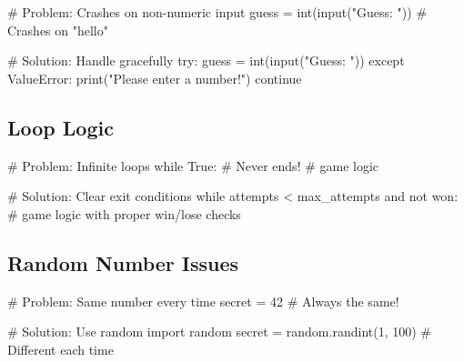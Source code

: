 \documentclass[
  letterpaper,
  DIV=11,
  numbers=noendperiod,
  oneside]{scrreprt}
\newenvironment{Shaded}{}{}
\newcommand{\BuiltInTok}[1]{\textcolor[rgb]{0.84,0.23,0.29}{#1}}
\newcommand{\CommentTok}[1]{\textcolor[rgb]{0.42,0.45,0.49}{#1}}
\newcommand{\ControlFlowTok}[1]{\textcolor[rgb]{0.84,0.23,0.29}{#1}}
\newcommand{\DecValTok}[1]{\textcolor[rgb]{0.00,0.36,0.77}{#1}}
\newcommand{\ImportTok}[1]{\textcolor[rgb]{0.01,0.18,0.38}{#1}}
\newcommand{\KeywordTok}[1]{\textcolor[rgb]{0.84,0.23,0.29}{#1}}
\newcommand{\NormalTok}[1]{\textcolor[rgb]{0.14,0.16,0.18}{#1}}
\newcommand{\OperatorTok}[1]{\textcolor[rgb]{0.14,0.16,0.18}{#1}}
\newcommand{\PreprocessorTok}[1]{\textcolor[rgb]{0.84,0.23,0.29}{#1}}
\newcommand{\StringTok}[1]{\textcolor[rgb]{0.01,0.18,0.38}{#1}}
\newcommand{\VariableTok}[1]{\textcolor[rgb]{0.89,0.38,0.04}{#1}}
\begin{document}
\begin{Shaded}
\begin{Highlighting}[]
\CommentTok{\# Problem: Crashes on non{-}numeric input}
\NormalTok{guess }\OperatorTok{=} \BuiltInTok{int}\NormalTok{(}\BuiltInTok{input}\NormalTok{(}\StringTok{"Guess: "}\NormalTok{))  }\CommentTok{\# Crashes on "hello"}

\CommentTok{\# Solution: Handle gracefully}
\ControlFlowTok{try}\NormalTok{:}
\NormalTok{    guess }\OperatorTok{=} \BuiltInTok{int}\NormalTok{(}\BuiltInTok{input}\NormalTok{(}\StringTok{"Guess: "}\NormalTok{))}
\ControlFlowTok{except} \PreprocessorTok{ValueError}\NormalTok{:}
    \BuiltInTok{print}\NormalTok{(}\StringTok{"Please enter a number!"}\NormalTok{)}
    \ControlFlowTok{continue}
\end{Highlighting}
\end{Shaded}

\subsection{Loop Logic}\label{loop-logic}

\begin{Shaded}
\begin{Highlighting}[]
\CommentTok{\# Problem: Infinite loops}
\ControlFlowTok{while} \VariableTok{True}\NormalTok{:  }\CommentTok{\# Never ends!}
    \CommentTok{\# game logic}

\CommentTok{\# Solution: Clear exit conditions}
\ControlFlowTok{while}\NormalTok{ attempts }\OperatorTok{\textless{}}\NormalTok{ max\_attempts }\KeywordTok{and} \KeywordTok{not}\NormalTok{ won:}
    \CommentTok{\# game logic with proper win/lose checks}
\end{Highlighting}
\end{Shaded}

\subsection{Random Number Issues}\label{random-number-issues}

\begin{Shaded}
\begin{Highlighting}[]
\CommentTok{\# Problem: Same number every time}
\NormalTok{secret }\OperatorTok{=} \DecValTok{42}  \CommentTok{\# Always the same!}

\CommentTok{\# Solution: Use random}
\ImportTok{import}\NormalTok{ random}
\NormalTok{secret }\OperatorTok{=}\NormalTok{ random.randint(}\DecValTok{1}\NormalTok{, }\DecValTok{100}\NormalTok{)  }\CommentTok{\# Different each time}
\end{Highlighting}
\end{Shaded}
\end{document}
